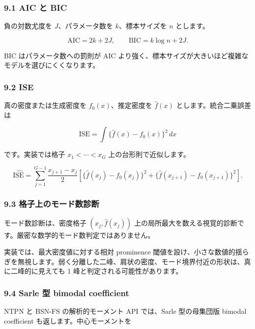 \documentclass[
]{article}
\begin{document}
\hypertarget{aic-ux3068-bic}{%
\subsubsection{9.1 AIC と BIC}\label{aic-ux3068-bic}}

負の対数尤度を \(J\)、パラメータ数を \(k\)、標本サイズを \(n\)
とします。

\[
\mathrm{AIC}=2k+2J,
\qquad
\mathrm{BIC}=k\log n+2J.
\]

BIC はパラメータ数への罰則が AIC
より強く、標本サイズが大きいほど複雑なモデルを選びにくくなります。

\hypertarget{ise}{%
\subsubsection{9.2 ISE}\label{ise}}

真の密度または生成密度を \(f_0(x)\)、推定密度を \(\hat f(x)\)
とします。統合二乗誤差は

\[
\mathrm{ISE}=\int\{\hat f(x)-f_0(x)\}^2\,dx
\]

です。実装では格子 \(x_1<\cdots<x_G\) 上の台形則で近似します。

\[
\widehat{\mathrm{ISE}}
=\sum_{j=1}^{G-1}\frac{x_{j+1}-x_j}{2}
\left[
\{\hat f(x_j)-f_0(x_j)\}^2
+\{\hat f(x_{j+1})-f_0(x_{j+1})\}^2
\right].
\]

\hypertarget{ux683cux5b50ux4e0aux306eux30e2ux30fcux30c9ux6570ux8a3aux65ad}{%
\subsubsection{9.3
格子上のモード数診断}\label{ux683cux5b50ux4e0aux306eux30e2ux30fcux30c9ux6570ux8a3aux65ad}}

モード数診断は、密度格子 \((x_j,\hat f(x_j))\)
上の局所最大を数える視覚的診断です。厳密な数学的モード数判定ではありません。

実装では、最大密度値に対する相対 prominence
閾値を設け、小さな数値的揺らぎを無視します。弱く分離した二峰、肩状の密度、モード境界付近の形状は、真に二峰的に見えても
1 峰と判定される可能性があります。

\hypertarget{sarle-ux578b-bimodal-coefficient}{%
\subsubsection{9.4 Sarle 型 bimodal
coefficient}\label{sarle-ux578b-bimodal-coefficient}}

NTPN と BSN-FS の解析的モーメント API では、Sarle 型の母集団版 bimodal
coefficient も返します。中心モーメントを
\end{document}
